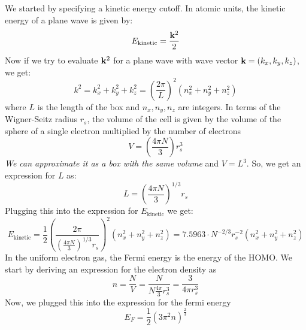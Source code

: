 \documentclass[12pt]{article}
\begin{document}
We started by specifying a kinetic energy cutoff. In atomic units, the kinetic energy of a plane wave is given by:
\begin{equation}
    E_{\text{kinetic}} = \frac{\vb{k}^2}{2}
\end{equation}
Now if we try to evaluate $\vb{k}^2$ for a plane wave with wave vector $\vb{k} = (k_x, k_y, k_z)$, we get:
\begin{equation}
    k^2 = k_x^2 + k_y^2 + k_z^2 =  \left(\frac{2\pi}{L}\right)^2 \left(n_x^2 + n_y^2 + n_z^2\right)
\end{equation}
where \( L \) is the length of the box and \( n_x, n_y, n_z \) are integers. In terms of the Wigner-Seitz radius \( r_s \), the volume of the cell is given by the volume of the sphere of a single electron multiplied by the number of electrons
\begin{equation}
    V = \left(\frac{4\pi N}{3}\right) r_s^3
\end{equation}
\emph{We can approximate it as a box with the same volume} and \( V= L^3 \). So, we get an expression for \( L \) as:
\begin{equation}
    L = \left( \frac{4\pi N}{3} \right)^{1/3} r_s
\end{equation}
Plugging this into the expression for $E_{\text{kinetic}}$ we get:
\begin{equation}
    E_{\text{kinetic}} = \frac{1}{2}\left(\frac{2 \pi}{\left( \frac{4\pi N}{3} \right)^{1/3} r_s}\right)^2 \left(n_x^2 + n_y^2 + n_z^2\right) = 7.5963 \cdot N^{-2/3} r_s^{-2} \left(n_x^2 + n_y^2 + n_z^2\right)
\end{equation}
In the uniform electron gas, the Fermi energy is the energy of the HOMO. We start by deriving an expression for the electron density as
\begin{equation}
    n = \frac{N}{V}= \frac{N}{N \frac{4 \pi }{3}r_s^3} = \frac{3}{4 \pi r_s^3}
\end{equation}
Now, we plugged this into the expression for the fermi energy
\begin{equation}
    E_F = \frac{1}{2}\left(3 \pi^2 n \right)^{\frac{2}{3}}
\end{equation}
\end{document}
